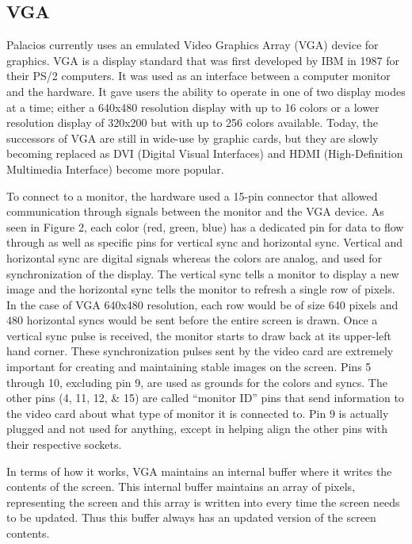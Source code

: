 \documentclass{acm_proc_article-sp}
\begin{document}
\subsection{VGA}
Palacios currently uses an emulated Video Graphics Array (VGA) device for graphics. VGA is a display standard that was first developed by IBM in 1987 for their PS/2 computers. It was used as an interface between a computer monitor and the hardware. It gave users the ability to operate in one of two display modes at a time; either a 640x480  resolution display with up to 16 colors or a lower resolution display of 320x200 but with up to 256 colors available. Today, the successors of VGA are still in wide-use by graphic cards, but they are slowly becoming replaced as DVI (Digital Visual Interfaces) and HDMI (High-Definition Multimedia Interface) become more popular.
\par
To connect to a monitor, the hardware used a 15-pin connector that allowed communication through signals between the monitor and the VGA device. As seen in Figure 2, each color (red, green, blue) has a dedicated pin for data to flow through as well as specific pins for vertical sync and horizontal sync. Vertical and horizontal sync are digital signals whereas the colors are analog, and used for synchronization of the display. The vertical sync tells a monitor to display a new image and the horizontal sync tells the monitor to refresh a single row of pixels. In the case of VGA 640x480 resolution, each row would be of size 640 pixels and 480 horizontal syncs would be sent before the entire screen is drawn. Once a vertical sync pulse is received, the monitor starts to draw back at its upper-left hand corner. These synchronization pulses sent by the video card are extremely important for creating and maintaining stable images on the screen. Pins 5 through 10, excluding pin 9, are used as grounds for the colors and syncs. The other pins (4, 11, 12, \& 15) are called “monitor ID” pins that send information to the video card about what type of monitor it is connected to. Pin 9 is actually plugged and not used for anything, except in helping align the other pins with their respective sockets. 

\par
 In terms of how it works, VGA maintains an internal buffer where it writes the contents of the screen. This internal buffer maintains an array of pixels, representing the screen and this array is written into every time the screen needs to be updated. Thus this buffer always has an updated version of the screen contents.
 
\end{document}
